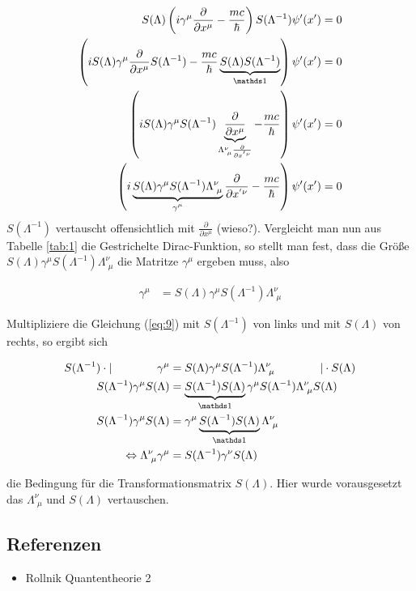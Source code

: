 \begin{align}
  \label{eq:8}
  S(\Lambda)  \left(i\gamma^\mu\frac{\partial}{\partial x^\mu}-\frac{mc}{\hbar}\right)S(\Lambda^{-1}) \psi'(x') &= 0 \notag \\
\left(iS(\Lambda) \gamma^\mu  \frac{\partial}{\partial x^\mu}S(\Lambda^{-1}) - \frac{mc}{\hbar}\underbr{S(\Lambda)S(\Lambda^{-1})}_{\mathds 1}\right)\psi'(x') &= 0 \notag \\
\left(iS(\Lambda) \gamma^\mu S(\Lambda^{-1}) \underbrace{\frac{\partial}{\partial x^\mu}}_{\Lambda^\nu_{\,\,\mu}\frac{\partial}{\partial x^{'\nu}}} - \frac{mc}{\hbar}\right)\psi'(x') &= 0 \notag \\
\left(i\underbr{S(\Lambda) \gamma^\mu S(\Lambda^{-1}) \Lambda^\nu_{\,\,\mu}}_{\gamma^\mu}\frac{\partial}{\partial x^{'\nu}} - \frac{mc}{\hbar}\right)\psi'(x') &= 0 \\
\end{align}
\(S(\Lambda^{-1})\) vertauscht offensichtlich mit \(\frac{\partial}{\partial x^\mu}\) (wieso?). Vergleicht man nun aus Tabelle \ref{tab:1} die Gestrichelte Dirac-Funktion, so stellt man fest, dass die Größe \( S(\Lambda) \gamma^\mu S(\Lambda^{-1}) \Lambda^\nu_{\,\,\mu}\) die Matritze \(\gamma^\mu\) ergeben muss, also

\begin{align}
  \label{eq:9}
  \gamma^\mu &= S(\Lambda) \gamma^\mu S(\Lambda^{-1}) \Lambda^\nu_{\,\,\mu} 
\end{align}

Multipliziere die Gleichung (\ref{eq:9}) mit \(S(\Lambda^{-1})\)  von links  und mit \(S(\Lambda)\) von rechts, so ergibt sich


\begin{align}
  \label{eq:10}
 S(\Lambda^{-1})\cdot|\qquad \qquad  \gamma^\mu &= S(\Lambda) \gamma^\mu S(\Lambda^{-1}) \Lambda^\nu_{\,\,\mu} \qquad \qquad |\cdot S(\Lambda) \notag \\
 S(\Lambda^{-1}) \gamma^\mu S(\Lambda) &=\underbr{S(\Lambda^{-1}) S(\Lambda)}_{\mathds 1} \gamma^\mu S(\Lambda^{-1}) \Lambda^\nu_{\,\,\mu} S(\Lambda) \notag \\
 S(\Lambda^{-1}) \gamma^\mu S(\Lambda) &= \gamma^\mu\underbr{ S(\Lambda^{-1})S(\Lambda)}_{\mathds 1} \Lambda^\nu_{\,\,\mu}  \notag \\
\Leftrightarrow   \Lambda^\nu_{\,\,\mu}\gamma^\mu &= S(\Lambda^{-1})\gamma^\nu S(\Lambda) 
\end{align}

die Bedingung für die Transformationsmatrix \(S(\Lambda)\). Hier wurde vorausgesetzt das \(\Lambda^\nu_{\,\,\mu}\) und \( S(\Lambda)\) vertauschen.  



\subsection*{Referenzen}
\begin{itemize}
\item Rollnik Quantentheorie 2
\end{itemize}


